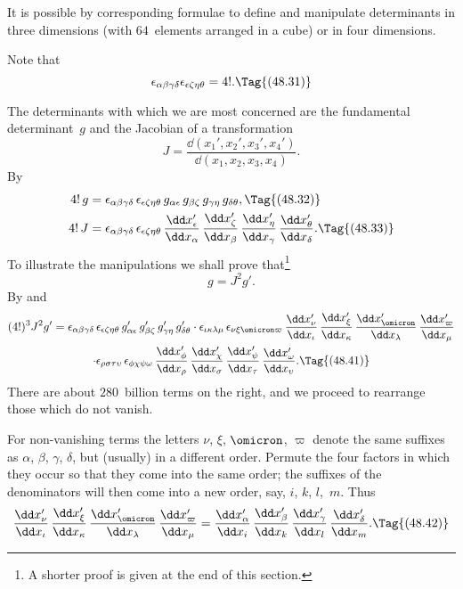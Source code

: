 \documentclass[12pt]{book}
\begin{document}
It is possible by corresponding formulae to define and manipulate determinants
in three dimensions (with $64$~elements arranged in a cube) or in
four dimensions.

Note that
\[
\epsilon_{\alpha\beta\gamma\delta} \epsilon_{\epsilon\zeta\eta\theta} = 4!.
\Tag{(48.31)}
\]

The determinants with which we are most concerned are the fundamental
determinant~$g$ and the Jacobian of a transformation
%
\[
J = \frac{\dd(x_{1}', x_{2}', x_{3}', x_{4}')}{\dd(x_{1}, x_{2}, x_{3}, x_{4})}.
\]
By~
\begin{align*}
  4!\, g &= \epsilon_{\alpha\beta\gamma\delta}\, \epsilon_{\epsilon\zeta\eta\theta}\,
  g_{\alpha\epsilon}\, g_{\beta\zeta}\, g_{\gamma\eta}\, g_{\delta\theta},
\Tag{(48.32)} \\
  4!\, J &= \epsilon_{\alpha\beta\gamma\delta}\, \epsilon_{\epsilon\zeta\eta\theta}\,
  \frac{\dd x_{\epsilon}'}{\dd x_{\alpha}}\,
  \frac{\dd x_{\zeta}'}{\dd x_{\beta}}\,
  \frac{\dd x_{\eta}'}{\dd x_{\gamma}}\,
  \frac{\dd x_{\theta}'}{\dd x_{\delta}}.
\Tag{(48.33)}
\end{align*}
To illustrate the manipulations we shall prove that\footnote
  {A shorter proof is given at the end of this section.}
\[
g = J^{2} g'.
\]
By  and~
\begin{multline*}
  (4!)^{3} J^{2} g'
  = \epsilon_{\alpha\beta\gamma\delta}\, \epsilon_{\epsilon\zeta\eta\theta}\,
  g_{\alpha\epsilon}'\, g_{\beta\zeta}'\, g_{\gamma\eta}'\, g_{\delta\theta}'
  \cdot \epsilon_{\iota\kappa\lambda\mu}\, \epsilon_{\nu\xi\omicron\varpi}\,
  \frac{\dd x_{\nu}'}{\dd x_{\iota}}\,
  \frac{\dd x_{\xi}'}{\dd x_{\kappa}}\,
  \frac{\dd x_{\omicron}'}{\dd x_{\lambda}}\,
  \frac{\dd x_{\varpi}'}{\dd x_{\mu}} \\
  \cdot \epsilon_{\rho\sigma\tau\upsilon}\, \epsilon_{\phi\chi\psi\omega}\,
  \frac{\dd x_{\phi}'}{\dd x_{\rho}}\,
  \frac{\dd x_{\chi}'}{\dd x_{\sigma}}\,
  \frac{\dd x_{\psi}'}{\dd x_{\tau}}\,
  \frac{\dd x_{\omega}'}{\dd x_{\upsilon}}.
  \Tag{(48.41)}
\end{multline*}
There are about $280$~billion terms on the right, and we proceed to rearrange
those which do not vanish.

For non-vanishing terms the letters $\nu$, $\xi$, $\omicron$, $\varpi$ denote the same suffixes as
$\alpha$, $\beta$, $\gamma$, $\delta$, but (usually) in a different order. Permute the four factors in which
they occur so that they come into the same order; the suffixes of the denominators
will then come into a new order, say, $i$, $k$, $l$,~$m$. Thus
\[
  \frac{\dd x_{\nu}'}{\dd x_{\iota}}\,
  \frac{\dd x_{\xi}'}{\dd x_{\kappa}}\,
  \frac{\dd x_{\omicron}'}{\dd x_{\lambda}}\,
  \frac{\dd x_{\varpi}'}{\dd x_{\mu}}
  = \frac{\dd x_{\alpha}'}{\dd x_{i}}\,
  \frac{\dd x_{\beta}'}{\dd x_{k}}\,
  \frac{\dd x_{\gamma}'}{\dd x_{l}}\,
  \frac{\dd x_{\delta}'}{\dd x_{m}}.
\Tag{(48.42)}
\]
\end{document}
